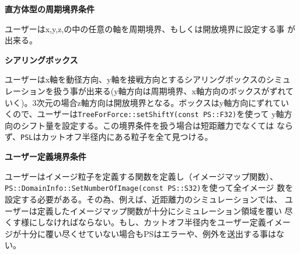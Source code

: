 {\bf 直方体型の周期境界条件}

ユーザーはx,y,z,の中の任意の軸を周期境界、もしくは開放境界に設定する事
が出来る。

{\bf シアリングボックス}

ユーザーはx軸を動径方向、y軸を接戦方向とするシアリングボックスのシミュ
レーションを扱う事が出来る(y軸方向は周期境界、x軸方向のボックスがずれて
いく)。3次元の場合z軸方向は開放境界となる。ボックスはy軸方向にずれてい
くので、ユーザーは{\tt TreeForForce::setShiftY(const PS::F32)}を使って
y軸方向のシフト量を設定する。この境界条件を扱う場合は短距離力でなくては
ならず、{\tt PSL}はカットオフ半径内にある粒子を全て見つける。

{\bf ユーザー定義境界条件}

ユーザーはイメージ粒子を定義する関数を定義し（イメージマップ関数）、
{\tt PS::DomainInfo::SetNumberOfImage(const PS::S32)}を使って全イメージ
数を設定する必要がある。その為、例えば、近距離力のシミュレーションでは、
ユーザーは定義したイメージマップ関数が十分にシミュレーション領域を覆い
尽くす様にしなければならない。もし、カットオフ半径内をユーザー定義イメー
ジが十分に覆い尽くせていない場合もPSはエラーや、例外を送出する事はない。


%

